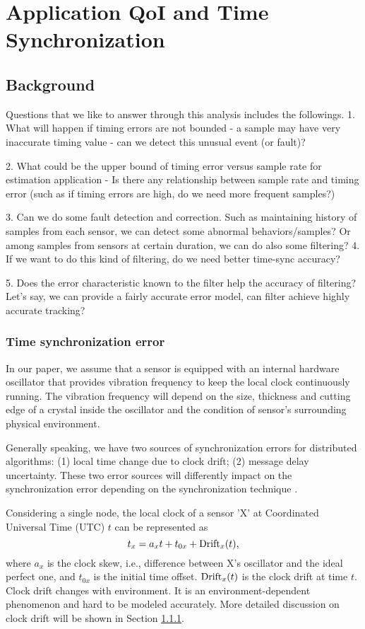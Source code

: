 \section{Application QoI and Time Synchronization}

\subsection{Background}
 Questions that we like to answer
through this analysis includes the followings. 1.  What will happen
if timing errors are not bounded - a sample may have very inaccurate
timing value - can we detect this unusual event (or fault)?

2.  What could be the upper bound of timing error versus sample rate
for estimation application - Is there any relationship between
sample rate and timing error (such as if timing errors are high, do
we need more frequent samples?)

3.  Can we do some fault detection and correction. Such as
maintaining history of samples from each sensor, we can detect some
abnormal behaviors/samples? Or among samples from sensors at certain
duration, we can do also some filtering? 4.  If we want to do this
kind of filtering, do we need better time-sync accuracy?

5.  Does the error characteristic known to the filter help the
accuracy of filtering? Let's say, we can provide a fairly accurate
error model, can filter achieve highly accurate tracking?

\subsubsection{Time synchronization error}
 In our paper, we assume that
a sensor is equipped with an internal hardware oscillator that
provides vibration frequency to keep the local clock continuously
running. The vibration frequency will depend on the size, thickness
and cutting edge of a crystal inside the oscillator and the
condition of sensor's surrounding physical environment.

Generally speaking, we have two sources of synchronization errors
for distributed algorithms: (1) local time change due to clock
drift; (2) message delay uncertainty. These two error sources will
differently impact on the synchronization error depending on
the synchronization technique \cite{wsn-timecali}.

Considering a single node, the local clock of a sensor 'X' at
Coordinated Universal Time (UTC) $t$ can be represented as
\cite{timing-error}
\[t_x = a_xt+ t_{0x} + \operatorname{Drift}_x(t),\]
where $a_x$ is the clock skew, i.e., difference between X's oscillator
and the ideal perfect one, and $t_{0x}$ is the initial time offset.
$\operatorname{Drift}_x(t)$ is the clock drift at time $t$. Clock drift changes with
environment. It is an environment-dependent phenomenon and hard to
be modeled accurately. More detailed discussion on clock drift will
be shown in Section \ref{}.

